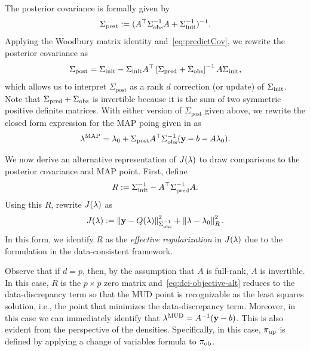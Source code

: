 The posterior covariance is formally given by
\begin{equation}\label{eq:map_cov}
\Sigma_\text{post} := ( A^\top {\Sigma}_\text{obs}^{-1} A + \Sigma_\text{init}^{-1} )^{-1}.
\end{equation}
Applying the Woodbury matrix identity and~\eqref{eq:predictCov}, we rewrite the posterior covariance as
\begin{equation}\label{eq:map_cov_analytical}
\Sigma_\text{post} = \Sigma_\text{init} - \Sigma_\text{init} A^\top \left[\Sigma_\text{pred} + \Sigma_\text{obs}\right]^{-1} A \Sigma_\text{init},
\end{equation}
which allows us to interpret $\Sigma_\text{post}$ as a rank $d$ correction (or update) of $\Sigma_\text{init}$.
Note that $\Sigma_\text{pred} + \Sigma_\text{obs}$ is invertible because it is the sum of two symmetric positive definite matrices.
With either version of $\Sigma_\text{post}$ given above, we rewrite the closed form expression for the MAP poing given in \cite{Tarantola_book} as
\begin{equation}\label{eq:map-point-analytical}
\lambda^{\text{MAP}} = \lambda_0 + \Sigma_\text{post} A^\top \Sigma_\text{obs}^{-1} (\mathbf{y} - b - A\lambda_0).
\end{equation}


We now derive an alternative representation of $J(\lambda)$ to draw comparisons to the posterior covariance and MAP point.
First, define
\begin{equation}\label{eq:eff_reg}
	R := \nolinebreak \initialCov^{-1} - \nolinebreak A^\top \predictedCov^{-1} A.
\end{equation}
Using this $R$, rewrite $J(\lambda)$ as
\begin{equation}\label{eq:dci-objective-alt}
J(\lambda):= \left\Vert\mathbf{y} - Q(\lambda)\right\Vert_{\Sigma_\text{obs}^{-1}}^2 + \left\Vert\lambda - \lambda_0\right\Vert_{R}^2.
\end{equation}
In this form, we identify $R$ as the {\em effective regularization} in $J(\lambda)$ due to the formulation in the data-consistent framework.


Observe that if $d=p$, then, by the assumption that $A$ is full-rank, $A$ is invertible.
In this case, $R$ is the $p\times p$ zero matrix and~\eqref{eq:dci-objective-alt} reduces to the data-discrepancy term so that the MUD point is recognizable as the least squares solution, i.e., the point that minimizes the data-discrepancy term.
Moreover, in this case we can immediately identify that $\lambda^{\text{MUD}} = A^{-1}(\mathbf{y}-b)$.
This is also evident from the perspective of the densities.
Specifically, in this case, $\operatorname*{\pi_{up}}$ is defined by applying a change of variables formula to $\operatorname*{\pi_{ob}}$.

